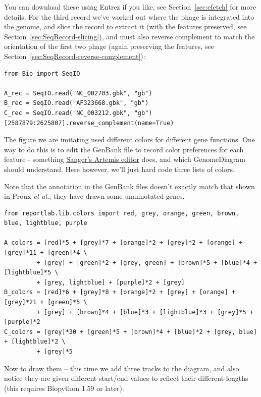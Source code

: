 \documentclass{report}
\begin{document}
You can download these using Entrez if you like, see Section~\ref{sec:efetch}
for more details. For the third record we've worked out where the phage is
integrated into the genome, and slice the record to extract it (with the
features preserved, see Section~\ref{sec:SeqRecord-slicing}), and must also
reverse complement to match the orientation of the first two phage (again
preserving the features, see Section~\ref{sec:SeqRecord-reverse-complement}):

\begin{verbatim}
from Bio import SeqIO

A_rec = SeqIO.read("NC_002703.gbk", "gb")
B_rec = SeqIO.read("AF323668.gbk", "gb")
C_rec = SeqIO.read("NC_003212.gbk", "gb")[2587879:2625807].reverse_complement(name=True)
\end{verbatim}

The figure we are imitating used different colors for different gene functions.
One way to do this is to edit the GenBank file to record color preferences for
each feature - something \href{http://www.sanger.ac.uk/resources/software/artemis/}
{Sanger's Artemis editor} does, and which GenomeDiagram should understand. Here
however, we'll just hard code three lists of colors.

Note that the annotation in the GenBank files doesn't exactly match that shown
in Proux \textit{et al.}, they have drawn some unannotated genes.

\begin{verbatim}
from reportlab.lib.colors import red, grey, orange, green, brown, blue, lightblue, purple

A_colors = [red]*5 + [grey]*7 + [orange]*2 + [grey]*2 + [orange] + [grey]*11 + [green]*4 \
         + [grey] + [green]*2 + [grey, green] + [brown]*5 + [blue]*4 + [lightblue]*5 \
         + [grey, lightblue] + [purple]*2 + [grey]
B_colors = [red]*6 + [grey]*8 + [orange]*2 + [grey] + [orange] + [grey]*21 + [green]*5 \
         + [grey] + [brown]*4 + [blue]*3 + [lightblue]*3 + [grey]*5 + [purple]*2
C_colors = [grey]*30 + [green]*5 + [brown]*4 + [blue]*2 + [grey, blue] + [lightblue]*2 \
         + [grey]*5
\end{verbatim}

Now to draw them -- this time we add three tracks to the diagram, and also notice they
are given different start/end values to reflect their different lengths (this requires
Biopython 1.59 or later).
\end{document}
